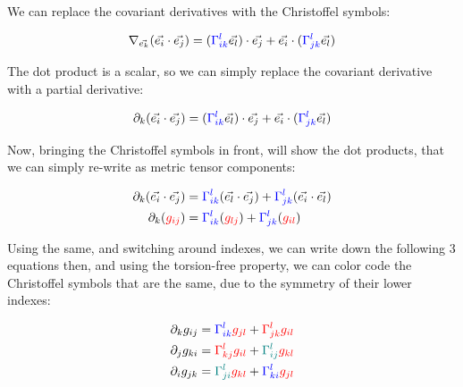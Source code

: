 We can replace the covariant derivatives with the Christoffel symbols:

\begin{equation}
       \nabla_{\vec{e_k}}(\vec{e_i} \cdot \vec{e_j}) = (\begingroup\color{blue}\Gamma^l_{ik}\endgroup\vec{e_l}) \cdot \vec{e_j} + \vec{e_i} \cdot (\begingroup\color{blue}\Gamma^l_{jk}\endgroup\vec{e_l}) 
\end{equation}

The dot product is a scalar, so we can simply replace the covariant derivative with a partial derivative:

\begin{equation}
       \partial_k(\vec{e_i} \cdot \vec{e_j}) = (\begingroup\color{blue}\Gamma^l_{ik}\endgroup\vec{e_l}) \cdot \vec{e_j} + \vec{e_i} \cdot (\begingroup\color{blue}\Gamma^l_{jk}\endgroup\vec{e_l}) 
\end{equation}

Now, bringing the Christoffel symbols in front, will show the dot products, that we can simply re-write as metric tensor components:

\begin{align*}
    \partial_k(\vec{e_i} \cdot \vec{e_j}) &= \begingroup\color{blue}\Gamma^l_{ik}\endgroup(\vec{e_l} \cdot \vec{e_j}) + \begingroup\color{blue}\Gamma^l_{jk}\endgroup(\vec{e_i} \cdot \vec{e_l}) \\
    \partial_k(\begingroup\color{red}g_{ij}\endgroup) &= \begingroup\color{blue}\Gamma^l_{ik}\endgroup(\begingroup\color{red}g_{lj}\endgroup) + \begingroup\color{blue}\Gamma^l_{jk}\endgroup(\begingroup\color{red}g_{il}\endgroup)
\end{align*}

Using the same, and switching around indexes, we can write down the following 3 equations then, and using the torsion-free property, we can color code the Christoffel symbols that
are the same, due to the symmetry of their lower indexes:

\begin{align*}
    \partial_k g_{ij} &= \begingroup\color{blue}\Gamma^l_{ik}\endgroup\begingroup\color{red}g_{jl}\endgroup + \begingroup\color{red}\Gamma^l_{jk}\endgroup\begingroup\color{red}g_{il}\endgroup\\
    \partial_j g_{ki} &= \begingroup\color{red}\Gamma^l_{kj}\endgroup\begingroup\color{red}g_{il}\endgroup + \begingroup\color{teal}\Gamma^l_{ij}\endgroup\begingroup\color{red}g_{kl}\endgroup\\
    \partial_i g_{jk} &= \begingroup\color{teal}\Gamma^l_{ji}\endgroup\begingroup\color{red}g_{kl}\endgroup + \begingroup\color{blue}\Gamma^l_{ki}\endgroup\begingroup\color{red}g_{jl}\endgroup
\end{align*}

